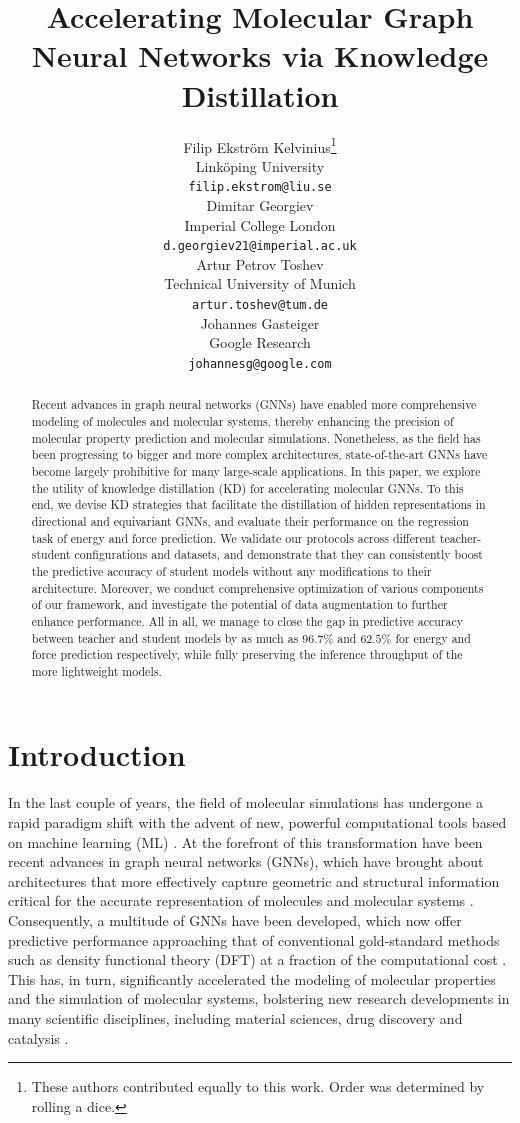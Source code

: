 \documentclass{article}
\title{Accelerating Molecular Graph Neural Networks via Knowledge Distillation}
\author{%
  Filip Ekström Kelvinius\thanks{These authors contributed equally to this work. Order was determined by rolling a dice.}\\
  Linköping University\\
  \texttt{filip.ekstrom@liu.se}\\
  \And
  Dimitar Georgiev\footnotemark[1]\\
  Imperial College London\\
  \texttt{d.georgiev21@imperial.ac.uk}\\
  \And
  Artur Petrov Toshev\footnotemark[1]\\
  Technical University of Munich\\
  \texttt{artur.toshev@tum.de}\\
  \And
  Johannes Gasteiger\\
  Google Research\\
  \texttt{johannesg@google.com}\\
}
\begin{document}
\maketitle

\begin{abstract}
Recent advances in graph neural networks (GNNs) have enabled more comprehensive modeling of molecules and molecular systems, thereby enhancing the precision of molecular property prediction and molecular simulations. Nonetheless, as the field has been progressing to bigger and more complex architectures, state-of-the-art GNNs have become largely prohibitive for many large-scale applications. In this paper, we explore the utility of knowledge distillation (KD) for accelerating molecular GNNs. To this end, we devise KD strategies that facilitate the distillation of hidden representations in directional and equivariant GNNs, and evaluate their performance on the regression task of energy and force prediction. We validate our protocols across different teacher-student configurations and datasets, and demonstrate that they can consistently boost the predictive accuracy of student models without any modifications to their architecture. Moreover, we conduct comprehensive optimization of various components of our framework, and investigate the potential of data augmentation to further enhance performance. All in all, we manage to close the gap in predictive accuracy between teacher and student models by as much as $96.7\%$ and $62.5\%$ for energy and force prediction respectively, while fully preserving the inference throughput of the more lightweight models.
\end{abstract}

\section{Introduction}
In the last couple of years, the field of molecular simulations has undergone a rapid paradigm shift with the advent of new, powerful computational tools based on machine learning (ML) \cite{noe2020machine}. At the forefront of this transformation have been recent advances in graph neural networks (GNNs), which have brought about architectures that more effectively capture geometric and structural information critical for the accurate representation of molecules and molecular systems \cite{wang2023graph, zhang2023artificial}. Consequently, a multitude of GNNs have been developed, which now offer predictive performance approaching that of conventional gold-standard methods such as density functional theory (DFT) at a fraction of the computational cost \cite{batzner_e3-equivariant_2022, gasteiger_directional_2020, gasteiger_dimenetpp_2020, gasteiger_gemnet_2021, gasteiger_gemnet_oc_2022, zitnick2022spherical}. This has, in turn, significantly accelerated the modeling of molecular properties and the simulation of molecular systems, bolstering new research developments in many scientific disciplines, including material sciences, drug discovery and catalysis \cite{westermayr2021perspective, reiser2022graph, zhang2022graph, xiong2021graph, sun2020graph}.
\end{document}
